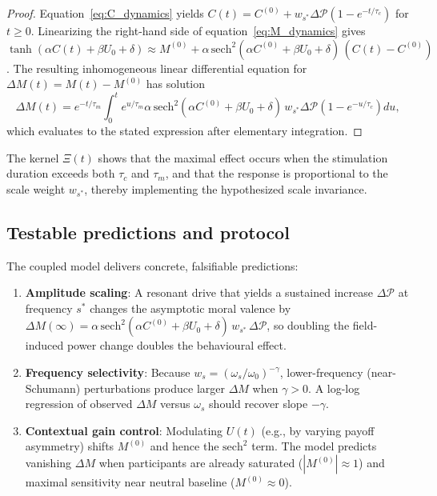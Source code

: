 \documentclass[12pt,a4paper]{article}
\theoremstyle{definition}
\begin{document}
\begin{proof}
Equation~\eqref{eq:C_dynamics} yields $C(t) = C^{(0)} + w_{s^\ast} \Delta \mathcal{P} (1 - e^{-t/\tau_c})$ for $t \ge 0$. Linearizing the right-hand side of equation~\eqref{eq:M_dynamics} gives $\tanh(\alpha C(t) + \beta U_0 + \delta) \approx M^{(0)} + \alpha \, \mathrm{sech}^2(\alpha C^{(0)} + \beta U_0 + \delta) \, (C(t) - C^{(0)})$. The resulting inhomogeneous linear differential equation for $\Delta M(t) = M(t) - M^{(0)}$ has solution
\[
\Delta M(t) = e^{-t/\tau_m} \int_{0}^{t} e^{u/\tau_m} \alpha \, \mathrm{sech}^2(\alpha C^{(0)} + \beta U_0 + \delta) \, w_{s^\ast} \Delta \mathcal{P} \left(1 - e^{-u/\tau_c}\right) du,
\]
which evaluates to the stated expression after elementary integration.
\end{proof}

The kernel $\Xi(t)$ shows that the maximal effect occurs when the stimulation duration exceeds both $\tau_c$ and $\tau_m$, and that the response is proportional to the scale weight $w_{s^\ast}$, thereby implementing the hypothesized scale invariance.

\subsection{Testable predictions and protocol}

The coupled model delivers concrete, falsifiable predictions:
\begin{enumerate}
    \item \textbf{Amplitude scaling}: A resonant drive that yields a sustained increase $\Delta \mathcal{P}$ at frequency $s^\ast$ changes the asymptotic moral valence by $\Delta M(\infty) = \alpha \, \mathrm{sech}^2(\alpha C^{(0)} + \beta U_0 + \delta) \, w_{s^\ast} \, \Delta \mathcal{P}$, so doubling the field-induced power change doubles the behavioural effect.
    \item \textbf{Frequency selectivity}: Because $w_s = (\omega_s/\omega_0)^{-\gamma}$, lower-frequency (near-Schumann) perturbations produce larger $\Delta M$ when $\gamma > 0$. A log-log regression of observed $\Delta M$ versus $\omega_s$ should recover slope $-\gamma$.
    \item \textbf{Contextual gain control}: Modulating $U(t)$ (e.g., by varying payoff asymmetry) shifts $M^{(0)}$ and hence the $\mathrm{sech}^2$ term. The model predicts vanishing $\Delta M$ when participants are already saturated ($|M^{(0)}| \approx 1$) and maximal sensitivity near neutral baseline ($M^{(0)} \approx 0$).
\end{enumerate}
\end{document}
